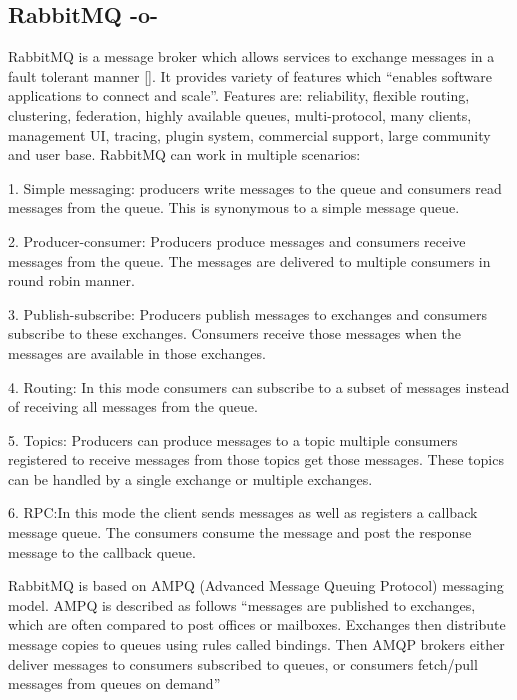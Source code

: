 \subsection{RabbitMQ   -o-}

RabbitMQ is a message broker which allows services to exchange
messages in a fault tolerant manner [\cite{www-rabbitmq}].  It provides
variety of features which ``enables software applications to connect
and scale''. Features are: reliability, flexible routing, clustering,
federation, highly available queues, multi-protocol, many clients,
management UI, tracing, plugin system, commercial support, large
community and user base. RabbitMQ can work in multiple scenarios:

     1. Simple messaging: producers write messages to the queue and
        consumers read messages from the queue. This is synonymous
        to a simple message queue.

     2. Producer-consumer: Producers produce messages and consumers
        receive messages from the queue. The messages are delivered to
        multiple consumers in round robin manner.

     3. Publish-subscribe: Producers publish messages to exchanges
        and consumers subscribe to these exchanges. Consumers receive
        those messages when the messages are available in those
        exchanges.

     4. Routing: In this mode consumers can subscribe to a subset
        of messages instead of receiving all messages from the queue.

     5. Topics: Producers can produce messages to a topic multiple
        consumers registered to receive messages from those topics get
        those messages. These topics can be handled by a single
        exchange or multiple exchanges.

     6. RPC:In this mode the client sends messages as well as
        registers a callback message queue. The consumers consume the
        message and post the response message to the callback queue.

        RabbitMQ is based on AMPQ (Advanced
        Message Queuing Protocol) messaging model\cite{ampq-article}.
        AMPQ is described
        as follows ``messages are published to exchanges, which are
        often compared to post offices or mailboxes. Exchanges then
        distribute message copies to queues using rules called
        bindings. Then AMQP brokers either deliver messages to
        consumers subscribed to queues, or consumers fetch/pull
        messages from queues on demand''



